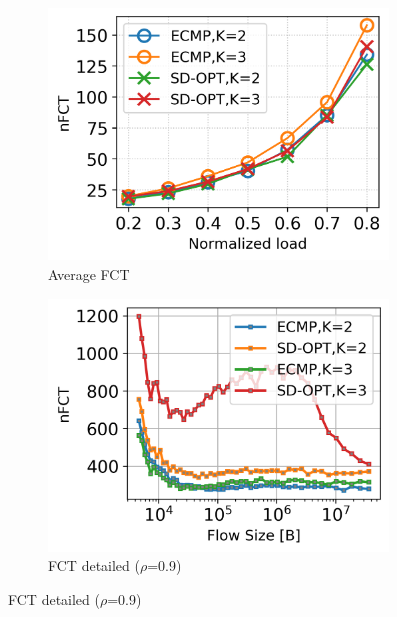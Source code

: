 \begin{figure}[!tb]
	\centering
	\begin{subfigure}{.33\textwidth}
		\centering
		\includegraphics[width=0.99\textwidth]{Chapter4/Figures/optimal_lb_thresh_K_2_3}
		\vspace{1.4pt}
		\caption{Average FCT}
		\label{fig:opt-vs-ecmp-fct}
	\end{subfigure}%
	\hfill
	\begin{subfigure}{.33\textwidth}
		\centering
		\includegraphics[width=0.99\textwidth]{Chapter4/Figures/optimal_lb_thresh_K_2_3_detailed}
		\captionsetup{justification=centering, width=0.7\linewidth}
		\caption{FCT detailed ($\rho$=0.9)}
		\label{fig:opt-vs-ecmp-fct-detailed}
	\end{subfigure}%

\end{figure}
